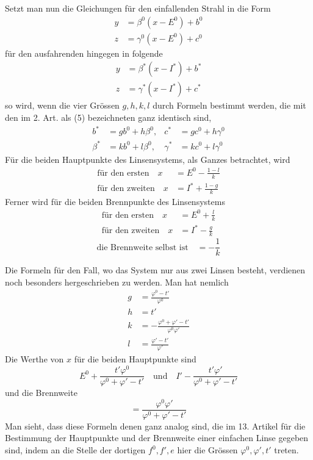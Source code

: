Setzt man nun die Gleichungen für den einfallenden Strahl in die Form
\[
\begin{aligned}
y&=\beta^0(x-E^0)+b^0\\
z&=\gamma^0(x-E^0)+c^0
\end{aligned}
\]
für den ausfahrenden hingegen in folgende
\[
\begin{aligned}
y&=\beta^*(x-I^*)+b^*\\
z&=\gamma^*(x-I^*)+c^*
\end{aligned}
\]
so wird, wenn die vier Grössen $g,h,k,l$ durch Formeln bestimmt werden, die mit den im 2. Art. als (5) bezeichneten ganz identisch sind,
\[
\begin{aligned}
b^*&=gb^0+h\beta^0,&c^*&=gc^0+h\gamma^0\\
\beta^*&=kb^0+l\beta^0,&\gamma^*&=kc^0+l\gamma^0
\end{aligned}
\]
Für die beiden Hauptpunkte des Linsensystems, als Ganzes betrachtet, wird
\[
\begin{aligned}
\text{für den ersten}\quad x&=E^0-\frac{1-l}{k}\\
\text{für den zweiten}\quad x&=I^*+\frac{1-g}{k}
\end{aligned}
\]
Ferner wird für die beiden Brennpunkte des Linsensystems
\[
\begin{aligned}
\text{für den ersten}\quad x&=E^0+\frac{l}{k}\\
\text{für den zweiten}\quad x&=I^*-\frac{g}{k}
\end{aligned}
\]
\[
\text{die Brennweite selbst ist}\quad=-\frac1k
\]

Die Formeln für den Fall, wo das System nur aus zwei Linsen besteht, verdienen noch besonders hergeschrieben zu werden. Man hat nemlich
\[
\begin{aligned}
g&=\frac{\varphi^0-t'}{\varphi^0}\\
h&=t'\\
k&=-\frac{\varphi^0+\varphi'-t'}{\varphi^0\varphi'}\\
l&=\frac{\varphi'-t'}{\varphi'}
\end{aligned}
\]
Die Werthe von $x$ für die beiden Hauptpunkte sind
\[
E^0+\frac{t'\varphi^0}{\varphi^0+\varphi'-t'}\quad\text{und}\quad I'-\frac{t'\varphi'}{\varphi^0+\varphi'-t'}
\]
und die Brennweite
\[
=\frac{\varphi^0\varphi'}{\varphi^0+\varphi'-t'}
\]
Man sieht, dass diese Formeln denen ganz analog sind, die im 13. Artikel für die Bestimmung der Hauptpunkte und der Brennweite einer einfachen Linse gegeben sind, indem an die Stelle der dortigen $f^0,f',e$ hier die Grössen $\varphi^0,\varphi',t'$ treten.

